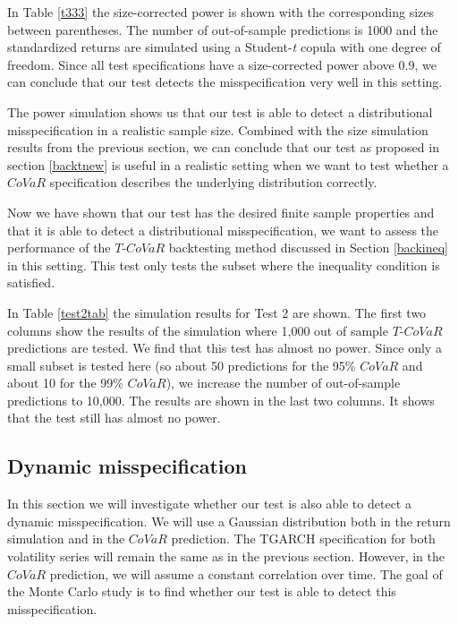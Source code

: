 \documentclass[12pt]{article}
\begin{document}
\noindent In Table \ref{t333} the size-corrected power is shown with the corresponding sizes between parentheses. The number of out-of-sample predictions is 1000 and the standardized returns are simulated using a Student-\textit{t} copula with one degree of freedom. Since all test specifications have a size-corrected power above 0.9, we can conclude that our test detects the misspecification very well in this setting.

The power simulation shows us that our test is able to detect a distributional misspecification in a realistic sample size. Combined with the size simulation results from the previous section, we can conclude that our test as proposed in section \ref{backtnew} is useful in a realistic setting when we want to test whether a $CoVaR$ specification describes the underlying distribution correctly.

Now we have shown that our test has the desired finite sample properties and that it is able to detect a distributional misspecification, we want to assess the performance of the $T$-$CoVaR$ backtesting method discussed in Section \ref{backineq} in this setting. This test only tests the subset where the inequality condition is satisfied.

In Table \ref{test2tab} the simulation results for Test 2 are shown. The first two columns show the results of the simulation where 1,000 out of sample $T$-$CoVaR$ predictions are tested. We find that this test has almost no power. Since only a small subset is tested here (so about 50 predictions for the 95\% $CoVaR$ and about 10 for the 99\% $CoVaR$), we increase the number of out-of-sample predictions to 10,000. The results are shown in the last two columns. It shows that the test still has almost no power.


\subsection{Dynamic misspecification} \label{dynmis}

In this section we will investigate whether our test is also able to detect a dynamic misspecification. We will use a Gaussian distribution both in the return simulation and in the $CoVaR$ prediction. The TGARCH specification for both volatility series will remain the same as in the previous section. However, in the $CoVaR$ prediction, we will assume a constant correlation over time. The goal of the Monte Carlo study is to find whether our test is able to detect this misspecification.
\end{document}
